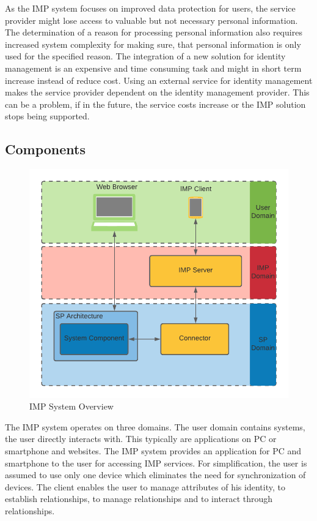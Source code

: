 As the IMP system focuses on improved data protection for users, the service provider might lose access to valuable but not necessary personal information. The determination of a reason for processing personal information also requires increased system complexity for making sure, that personal information is only used for the specified reason. The integration of a new solution for identity management is an expensive and time consuming task and might in short term increase instead of reduce cost. Using an external service for identity management makes the service provider dependent on the identity management provider. This can be a problem, if in the future, the service costs increase or the IMP solution stops being supported.

\subsection{Components}

\begin{figure}[h]
\caption{IMP System Overview}
    \centering
    \includegraphics[scale=0.25]{Diagrams/IMP System Overview.png}
\end{figure}

The IMP system operates on three domains. The user domain contains systems, the user directly interacts with. This typically are applications on PC or smartphone and websites. The IMP system provides an application for PC and smartphone to the user for accessing IMP services. For simplification, the user is assumed to use only one device which eliminates the need for synchronization of devices. The client enables the user to manage attributes of his identity, to establish relationships, to manage relationships and to interact through relationships. 

